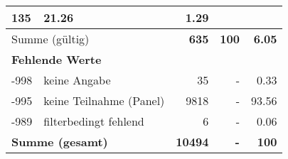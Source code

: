 \begin{longtable}{lXrrr}
       \num{135} &
       \num[round-mode=places,round-precision=2]{21.26} &
         \num[round-mode=places,round-precision=2]{1.29} \\
     \midrule
     \multicolumn{2}{l}{Summe (gültig)} &
       \textbf{\num{635}} &
     \textbf{\num{100}} &
       \textbf{\num[round-mode=places,round-precision=2]{6.05}} \\
     \multicolumn{5}{l}{\textbf{Fehlende Werte}}\\
       -998 &
       keine Angabe &
         \num{35} &
        - &
         \num[round-mode=places,round-precision=2]{0.33} \\
       -995 &
       keine Teilnahme (Panel) &
         \num{9818} &
        - &
         \num[round-mode=places,round-precision=2]{93.56} \\
       -989 &
       filterbedingt fehlend &
         \num{6} &
        - &
         \num[round-mode=places,round-precision=2]{0.06} \\
     \midrule
     \multicolumn{2}{l}{\textbf{Summe (gesamt)}} &
          \textbf{\num{10494}} &
        \textbf{-} &
        \textbf{\num{100}} \\
     \bottomrule
     \end{longtable}
     
